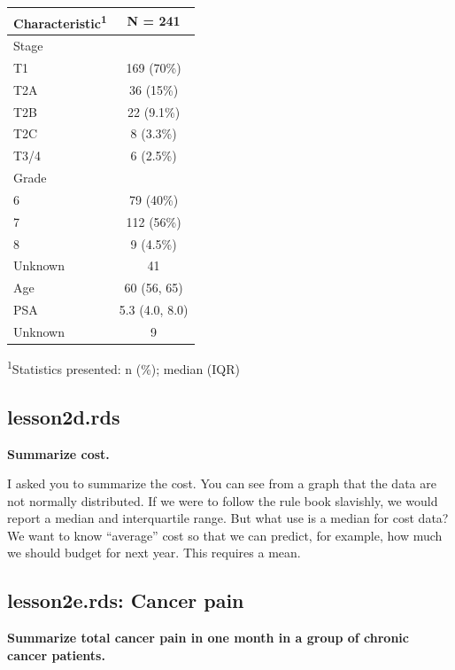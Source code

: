 \documentclass[]{book}
\begin{document}
\captionsetup[table]{labelformat=empty,skip=1pt}
\begin{longtable}{lc}
\toprule
\textbf{Characteristic}\textsuperscript{1} & \textbf{N = 241} \\ 
\midrule
Stage &  \\ 
T1 & 169 (70\%) \\ 
T2A & 36 (15\%) \\ 
T2B & 22 (9.1\%) \\ 
T2C & 8 (3.3\%) \\ 
T3/4 & 6 (2.5\%) \\ 
Grade &  \\ 
6 & 79 (40\%) \\ 
7 & 112 (56\%) \\ 
8 & 9 (4.5\%) \\ 
Unknown & 41 \\ 
Age & 60 (56, 65) \\ 
PSA & 5.3 (4.0, 8.0) \\ 
Unknown & 9 \\ 
\bottomrule
\end{longtable}
\vspace{-5mm}
\begin{minipage}{\linewidth}
\textsuperscript{1}Statistics presented: n (\%); median (IQR) \\ 
\end{minipage}

\hypertarget{lesson2d.rds}{%
\subsection{lesson2d.rds}\label{lesson2d.rds}}

\textbf{Summarize cost.}

I asked you to summarize the cost. You can see from a graph that the
data are not normally distributed. If we were to follow the rule book
slavishly, we would report a median and interquartile range. But what
use is a median for cost data? We want to know ``average'' cost so that
we can predict, for example, how much we should budget for next year.
This requires a mean.

\hypertarget{lesson2e.rds-cancer-pain}{%
\subsection{lesson2e.rds: Cancer pain}\label{lesson2e.rds-cancer-pain}}

\textbf{Summarize total cancer pain in one month in a group of chronic
cancer patients.}
\end{document}
